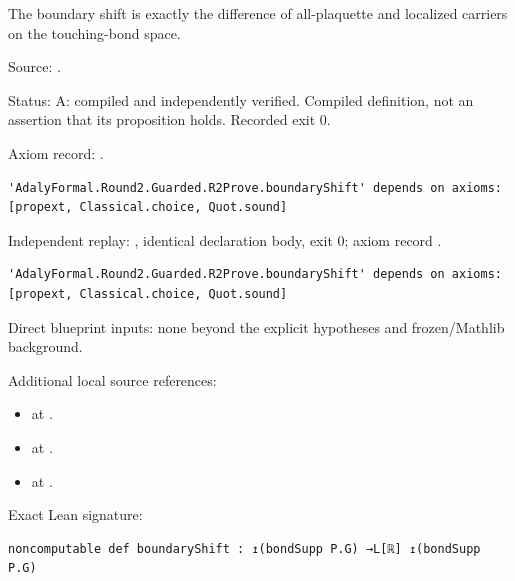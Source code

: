 \begin{definition}[bp-011]
\label{bp-011}
\uses{}
\leanok
The boundary shift is exactly the difference of all-plaquette and localized carriers on the touching-bond space.

\par Source: \texttt{}.
\par Status: A: compiled and independently verified. Compiled definition, not an assertion that its proposition holds. Recorded exit 0.
\par Axiom record: \texttt{}.
\begin{verbatim}
'AdalyFormal.Round2.Guarded.R2Prove.boundaryShift' depends on axioms: [propext, Classical.choice, Quot.sound]
\end{verbatim}
\par Independent replay: \texttt{}, identical declaration body, exit 0; axiom record \texttt{}.
\begin{verbatim}
'AdalyFormal.Round2.Guarded.R2Prove.boundaryShift' depends on axioms: [propext, Classical.choice, Quot.sound]
\end{verbatim}
\par Direct blueprint inputs: none beyond the explicit hypotheses and frozen/Mathlib background.
\par Additional local source references:
\begin{itemize}
\item \texttt{} at \texttt{}.
\item \texttt{} at \texttt{}.
\item \texttt{} at \texttt{}.
\end{itemize}
\par Exact Lean signature:
\begin{verbatim}
noncomputable def boundaryShift : ↥(bondSupp P.G) →L[ℝ] ↥(bondSupp P.G)
\end{verbatim}
\end{definition}

